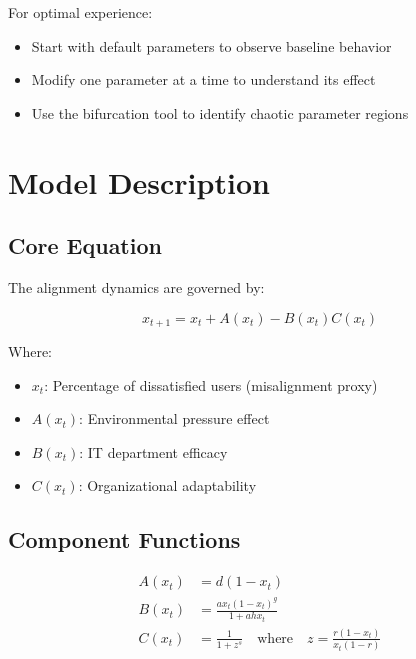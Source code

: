 \documentclass[a4paper, 10pt]{article}
\begin{document}
For optimal experience:
\begin{itemize}
	\item Start with default parameters to observe baseline behavior
	\item Modify one parameter at a time to understand its effect
	\item Use the bifurcation tool to identify chaotic parameter regions
\end{itemize}

\section{Model Description}
\subsection{Core Equation}
The alignment dynamics are governed by:

\begin{equation}
	x_{t + 1} = x_t + A(x_t) - B(x_t)C(x_t)
\end{equation}

Where:
\begin{itemize}
	\item $x_t$: Percentage of dissatisfied users (misalignment proxy)
	\item $A(x_t)$: Environmental pressure effect
	\item $B(x_t)$: IT department efficacy
	\item $C(x_t)$: Organizational adaptability
\end{itemize}

\subsection{Component Functions}
\begin{align}
	A(x_t) & = d(1 - x_t)                                                                     \\
	B(x_t) & = \frac{a x_t (1 - x_t)^g}{1 + a h x_t}                                          \\
	C(x_t) & = \frac{1}{1 + z^s} \quad \text{where} \quad z = \frac{r (1 - x_t)}{x_t (1 - r)}
\end{align}
\end{document}
